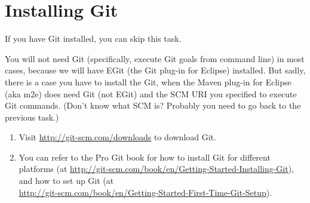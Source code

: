 
\section{Installing Git}

If you have Git installed, you can skip this task.

You will not need Git (specifically, execute Git goals from command line) in
most cases, because we will have EGit (the Git plug-in for Eclipse) installed.
But sadly, there is a case you have to install the Git, when the Maven plug-in
for Eclipse (aka m2e) does need Git (not EGit) and the SCM URI you specified to
execute Git commands. (Don't know what SCM is? Probably you need to go back to
the previous task.)

\begin{enumerate}

\item Visit \url{http://git-scm.com/downloads} to download Git.

\item You can refer to the Pro Git book for how to install Git for different
platforms (at \url{http://git-scm.com/book/en/Getting-Started-Installing-Git}),
and how to set up Git (at
\\\url{http://git-scm.com/book/en/Getting-Started-First-Time-Git-Setup}).

\end{enumerate}